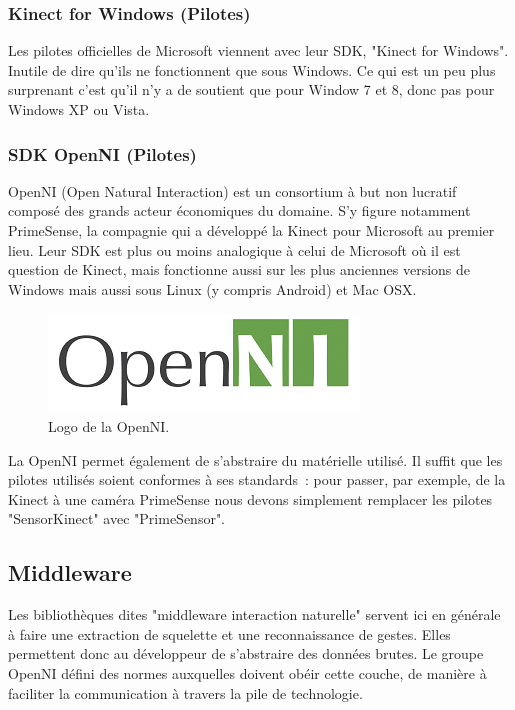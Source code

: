 \documentclass[french,12pt]{report}
\begin{document}
  \subsubsection{Kinect for Windows (Pilotes)}  
  Les pilotes officielles de Microsoft viennent avec leur SDK, "Kinect for 
  Windows". Inutile de dire
  qu'ils ne fonctionnent que sous Windows. Ce qui est un peu plus surprenant 
  c'est qu'il n'y a de soutient que pour Window 7 et 8, donc pas pour Windows XP 
  ou Vista.
  \subsubsection{SDK OpenNI (Pilotes)}
  OpenNI (Open Natural Interaction) est un consortium à but non lucratif composé
  des grands acteur économiques du domaine. S'y figure notamment PrimeSense, la 
  compagnie qui a développé la Kinect pour Microsoft au premier lieu. Leur SDK
  est plus ou moins analogique à celui de Microsoft où il est question de
  Kinect, mais fonctionne aussi sur les plus anciennes 
  versions de Windows mais
  aussi sous Linux (y compris Android) et Mac OSX.
  \begin{figure}[h!]
  \centering
  \includegraphics[width=0.4\linewidth]{images/openni_logo}
  \caption{Logo de la OpenNI.}
  \end{figure}
  La OpenNI permet également de s'abstraire du matérielle utilisé. Il suffit que
  les pilotes utilisés soient conformes à ses standards~: pour passer, par 
  exemple, de la Kinect à une caméra PrimeSense nous devons simplement remplacer 
  les pilotes "SensorKinect" avec "PrimeSensor".
  
  
  \subsection{Middleware}
  Les bibliothèques dites "middleware interaction naturelle" servent ici en 
  générale à faire une 
  extraction de squelette et une reconnaissance de gestes. Elles permettent donc 
  au développeur de s'abstraire des données brutes. Le groupe OpenNI défini 
  des normes auxquelles doivent obéir cette couche, de 
  manière à faciliter la communication à travers la pile de technologie.
  
\end{document}
